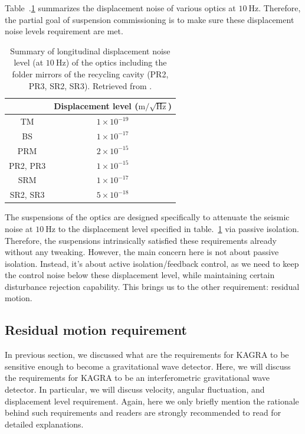 Table~.\ref{table:displacement_noise_requirement} summarizes the displacement noise of various optics at $10~\mathrm{Hz}$.
Therefore, the partial goal of suspension commissioning is to make sure these displacement noise levels requirement are met.
\begin{table}[!h]
	\centering
	\begin{tabular}{|c|c|}
		\hline
		& Displacement level ($\mathrm{m}/\sqrt{\mathrm{Hz}}$)\\
		\hline
		TM &  $1\times 10^{-19}$\\
		\hline
		BS &  $1\times 10^{-17}$\\
		\hline
		PRM & $2\times 10^{-15}$\\
		\hline
		PR2, PR3 & $1\times 10^{-15}$\\
		\hline
		SRM & $1\times 10^{-17}$\\
		\hline
		SR2, SR3 & $5\times 10^{-18}$\\
		\hline
	\end{tabular}
	\caption{Summary of longitudinal displacement noise level (at $10~\mathrm{Hz}$) of the optics including the folder mirrors of the recycling cavity (PR2, PR3, SR2, SR3). Retrieved from \cite{Sekiguchi:2016bmv}.}
	\label{table:displacement_noise_requirement}
\end{table}
The suspensions of the optics are designed specifically to attenuate the seismic noise at $10~\mathrm{Hz}$ to the displacement level specified in table.~\ref{table:displacement_noise_requirement} via passive isolation.
Therefore, the suspensions intrinsically satisfied these requirements already without any tweaking.
However, the main concern here is not about passive isolation.
Instead, it's about active isolation/feedback control, as we need to keep the control noise below these displacement level, while maintaining certain disturbance rejection capability.
This brings us to the other requirement: residual motion.

\subsection{Residual motion requirement}
In previous section, we discussed what are the requirements for KAGRA to be sensitive enough to become a gravitational wave detector.
Here, we will discuss the requirements for KAGRA to be an interferometric gravitational wave detector.
In particular, we will discuss velocity, angular fluctuation, and displacement level requirement.
Again, here we only briefly mention the rationale behind such requirements and readers are strongly recommended to read \cite{Sekiguchi:2016bmv} for detailed explanations.

